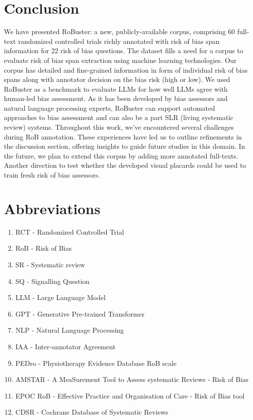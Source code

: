 \documentclass[sn-mathphys,Numbered]{sn-jnl}%
\theoremstyle{thmstyleone}%
\theoremstyle{thmstyletwo}%
\theoremstyle{thmstylethree}%
\begin{document}
\section{Conclusion}
\label{sec:conclusion}
%
We have presented RoBuster: a new, publicly-available corpus, comprising 60 full-text randomized controlled trials richly annotated with risk of bias span information for 22 risk of bias questions.
The dataset fills a need for a corpus to evaluate risk of bias span extraction using machine learning technologies.
Our corpus has detailed and fine-grained information in form of individual risk of bias spans along with annotator decision on the bias risk (high or low).
We used RoBuster as a benchmark to evaluate LLMs for how well LLMs agree with human-led bias assessment.
As it has been developed by bias assessors and natural language processing experts, RoBuster can support automated approaches to bias assessment and can also be a part SLR (living systematic review) systems.
Throughout this work, we've encountered several challenges during RoB annotation.
These experiences have led us to outline refinements in the discussion section, offering insights to guide future studies in this domain.
In the future, we plan to extend this corpus by adding more annotated full-texts.
Another direction to test whether the developed visual placards could be used to train fresh risk of bias assessors.
%
%
%
\section{Abbreviations}%
%
\begin{enumerate}
    \item RCT - Randomized Controlled Trial
    \item RoB - Risk of Bias
    \item SR - Systematic review
    \item SQ - Signalling Question
    \item LLM - Large Language Model
    \item GPT - Generative Pre-trained Transformer
    \item NLP - Natural Language Processing
    \item IAA - Inter-annotator Agreement
    \item PEDro - Physiotherapy Evidence Database RoB scale
    \item AMSTAR - A MeaSurement Tool to Assess systematic Reviews - Risk of Bias
    \item EPOC RoB - Effective Practice and Organisation of Care - Risk of Bias tool
    \item CDSR - Cochrane Database of Systematic Reviews
\end{enumerate}
%
%
%
\backmatter
\end{document}

